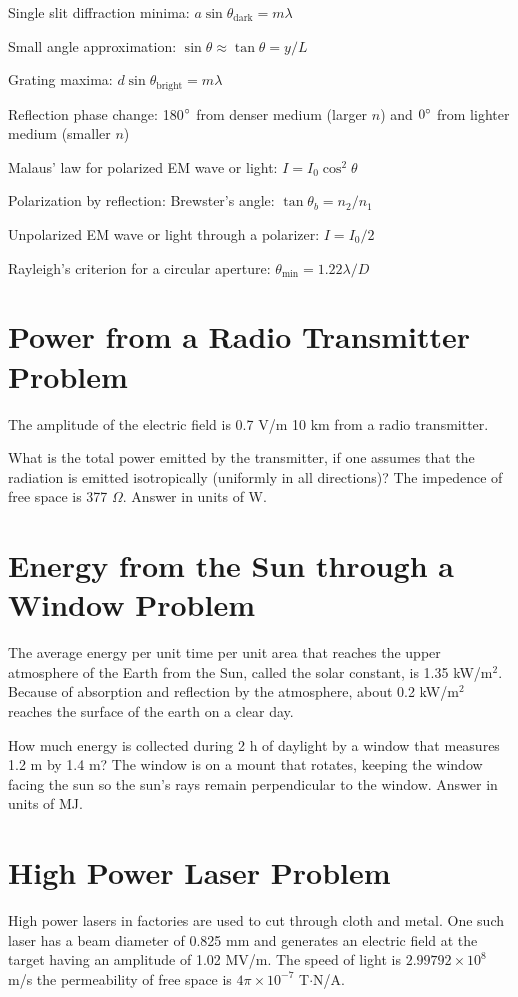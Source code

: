 \documentclass[../physics12.tex]{subfiles}
\begin{document}
Single slit diffraction minima: $a\sin\theta_{\text{dark}} = m\lambda$

Small angle approximation: $\sin\theta \approx \tan\theta = y/L$

Grating maxima: $d\sin\theta_{\text{bright}} = m\lambda$

Reflection phase change: 180$\degree$ from denser medium (larger $n$) and $0\degree$ from lighter medium (smaller $n$)

Malaus' law for polarized EM wave or light: $I=I_0\cos^2\theta$

Polarization by reflection: Brewster's angle: $\tan\theta_b = n_2/n_1$

Unpolarized EM wave or light through a polarizer: $I=I_0/2$

Rayleigh's criterion for a circular aperture: $\theta_{\text{min}} = 1.22\lambda/D$

\section{Power from a Radio Transmitter Problem}
The amplitude of the electric field is 0.7 V/m 10 km from a radio transmitter.

What is the total power emitted by the transmitter, if one assumes that the radiation is emitted isotropically (uniformly in all directions)? The 
impedence of free space is 377 $\Omega$. Answer in units of W.

\section{Energy from the Sun through a Window Problem}
The average energy per unit time per unit area that reaches the upper atmosphere of the Earth from the Sun, called the solar constant, is 1.35 kW/m$^2$.
Because of absorption and reflection by the atmosphere, about 0.2 kW/m$^2$ reaches the surface of the earth on a clear day.

How much energy is collected during 2 h of daylight by a window that measures 1.2 m by 1.4 m? The window is on a mount that rotates, keeping the window facing the sun 
so the sun's rays remain perpendicular to the window. Answer in units of MJ.

\section{High Power Laser Problem}
High power lasers in factories are used to cut through cloth and metal. One such laser has a beam diameter of 0.825 mm and generates an electric field at the target having an amplitude of 1.02 MV/m.
The speed of light is $2.99792\times 10^8$ m/s the permeability of free space is $4\pi \times 10^{-7}$ T$\cdot$N/A.
\end{document}
